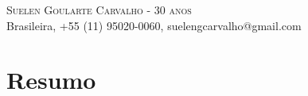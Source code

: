 \documentclass[a4paper, oneside, final]{scrartcl}
\newcommand{\vspc}{\vspace{0.15cm}} %
\begin{document}
\begin{center}
\textsc{\Huge{Suelen Goularte Carvalho - 30 anos}} \vspc\\
{\small Brasileira, +55 (11) 95020-0060, suelengcarvalho@gmail.com} 





\section{Resumo}
\begin{tabularx}{1\linewidth}{X}




\end{tabularx}
\end{center}
\end{document}
